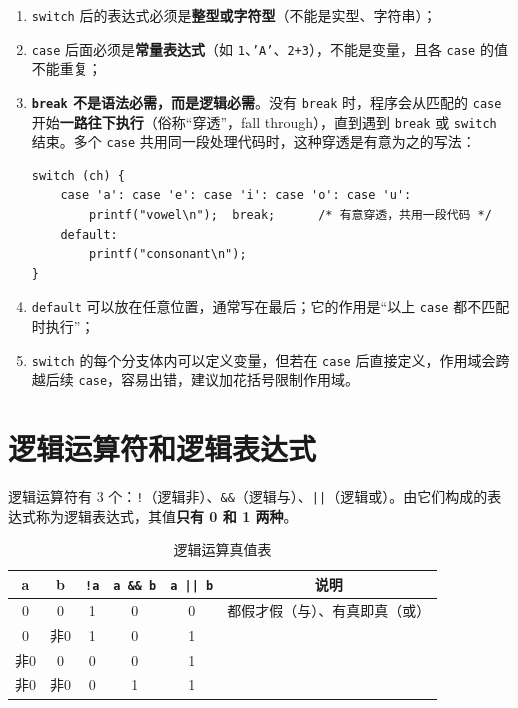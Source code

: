 \begin{enumerate}
  \item \texttt{switch} 后的表达式必须是\textbf{整型或字符型}（不能是实型、字符串）；
  \item \texttt{case} 后面必须是\textbf{常量表达式}（如 \texttt{1}、\texttt{'A'}、\texttt{2+3}），不能是变量，且各 \texttt{case} 的值不能重复；
  \item \textbf{\texttt{break} 不是语法必需，而是逻辑必需}。没有 \texttt{break} 时，程序会从匹配的 \texttt{case} 开始\textbf{一路往下执行}（俗称“穿透”，fall through），直到遇到 \texttt{break} 或 \texttt{switch} 结束。多个 \texttt{case} 共用同一段处理代码时，这种穿透是有意为之的写法：
\begin{lstlisting}
switch (ch) {
    case 'a': case 'e': case 'i': case 'o': case 'u':
        printf("vowel\n");  break;      /* 有意穿透，共用一段代码 */
    default:
        printf("consonant\n");
}
\end{lstlisting}
  \item \texttt{default} 可以放在任意位置，通常写在最后；它的作用是“以上 \texttt{case} 都不匹配时执行”；
  \item \texttt{switch} 的每个分支体内可以定义变量，但若在 \texttt{case} 后直接定义，作用域会跨越后续 \texttt{case}，容易出错，建议加花括号限制作用域。
\end{enumerate}


\section{逻辑运算符和逻辑表达式}

逻辑运算符有 3 个：\texttt{!}（逻辑非）、\texttt{\&\&}（逻辑与）、\texttt{||}（逻辑或）。由它们构成的表达式称为逻辑表达式，其值\textbf{只有 0 和 1 两种}。

\begin{table}[htbp]
\centering
\caption{逻辑运算真值表}
\small
\begin{tabular}{@{}ccc|cc|c@{}}
\toprule
a & b & \texttt{!a} & \texttt{a \&\& b} & \texttt{a || b} & 说明 \\
\midrule
0 & 0 & 1 & 0 & 0 & 都假才假（与）、有真即真（或） \\
0 & 非0 & 1 & 0 & 1 & \\
非0 & 0 & 0 & 0 & 1 & \\
非0 & 非0 & 0 & 1 & 1 & \\
\bottomrule
\end{tabular}
\end{table}

